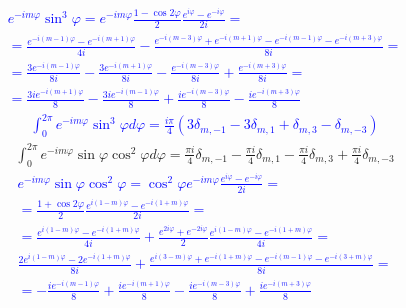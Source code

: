 %
\textcolor{blue}{ \begin{equation*} \begin{aligned}
e^{-i m \varphi} \sin^3 \varphi = e^{-i m \varphi} 
\frac{1 - \cos 2\varphi}{2} \frac{e^{i\varphi} - e^{-i\varphi}}{2i} = \\
= \frac{e^{-i(m-1)\varphi} - e^{-i(m+1)\varphi}}{4i} - 
\frac{e^{-i(m-3)\varphi} + e^{-i(m+1)\varphi} -
e^{-i(m-1)\varphi} - e^{-i(m+3)\varphi}}{8i} = \\
= \frac{3 e^{-i(m-1)\varphi}}{8i} - \frac{3 e^{-i(m+1)\varphi}}{8i} - 
\frac{e^{-i(m-3)\varphi}}{8i} + \frac{e^{-i(m+3)\varphi}}{8i} = \\
= \frac{3i e^{-i(m+1)\varphi}}{8} - \frac{3i e^{-i(m-1)\varphi}}{8} + 
\frac{i e^{-i(m-3)\varphi}}{8} - \frac{i e^{-i(m+3)\varphi}}{8} 
\end{aligned} \end{equation*} }
%
\textcolor{blue}{ \begin{equation*} \begin{aligned}
\int_{0}^{2\pi} e^{-i m \varphi} \sin^3 \varphi d \varphi = 
\frac{i\pi}{4} \left( 3 \delta_{m,-1} - 3 \delta_{m,1} + 
\delta_{m,3} - \delta_{m,-3} \right)
\end{aligned} \end{equation*} }
%
\begin{equation} \begin{aligned} \label{eq:int_exp5}
\int_0^{2\pi} e^{-i m \varphi} \sin \varphi \cos^2 \varphi d \varphi = 
\frac{\pi i }{4} \delta_{m,-1} - \frac{\pi i }{4} \delta_{m,1} -
\frac{\pi i }{4} \delta_{m,3} + \frac{\pi i }{4} \delta_{m,-3}
\end{aligned} \end{equation}
%
\textcolor{blue}{ \begin{equation*} \begin{aligned}
e^{-i m \varphi} \sin \varphi \cos^2 \varphi = 
\cos^2 \varphi e^{-i m \varphi} \frac{e^{i\varphi} - e^{-i\varphi}}{2i} = \\
= \frac{1 + \cos 2\varphi}{2} 
\frac{e^{i(1-m)\varphi} - e^{-i(1+m)\varphi}}{2i} = \\
= \frac{e^{i(1-m)\varphi} - e^{-i(1+m)\varphi}}{4i} + 
\frac{e^{2i\varphi} + e^{-2i\varphi}}{2} 
\frac{e^{i(1-m)\varphi} - e^{-i(1+m)\varphi}}{4i} = \\
\frac{ 2 e^{i(1-m)\varphi} - 2 e^{-i(1+m)\varphi}}{8i} +
\frac{e^{i(3-m)\varphi} + e^{-i(1+m)\varphi} - 
e^{-i(m-1)\varphi} - e^{-i(3+m)\varphi}}{8i} = \\
= -\frac{ i e^{-i (m-1) \varphi} }{8} + \frac{ i e^{-i (m+1) \varphi} }{8} -
\frac{ i e^{-i (m-3) \varphi} }{8} + \frac{ i e^{-i (m+3) \varphi} }{8}
\end{aligned} \end{equation*} }
